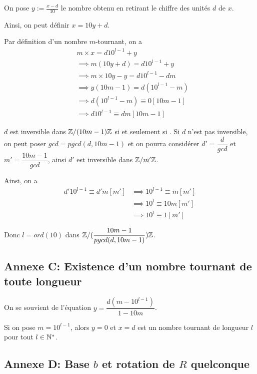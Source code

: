 \documentclass[a4paper,12pt]{article}
\begin{document}
\begin{demonstration}
    On pose $y := \frac{x - d}{10}$ le nombre obtenu en retirant le chiffre des unités $d$ de $x$.

    Ainsi, on peut définir $x = 10y + d$.

    Par définition d'un nombre $m$-tournant, on a
    \begin{align*}
        &m \times x = d10^{l - 1} + y \\
        &\implies m(10y + d) = d10^{l - 1} + y \\
        &\implies m \times 10y - y = d10^{l - 1} - dm \\
        &\implies y(10m - 1) = d(10^{l - 1} - m) \\
        &\implies d(10^{l - 1} - m) \equiv 0 [10m - 1] \\
        &\implies d 10^{l - 1} \equiv dm [10m - 1]
    \end{align*}

    $d$ est inversible dans $\mathbb{Z}/(10m - 1)\mathbb{Z}$ si et seulement si .
    Si $d$ n'est pas inversible, on peut poser $gcd = pgcd(d, 10m - 1)$ et on pourra considérer $d' = \dfrac{d}{gcd}$ et $m' = \dfrac{10m - 1}{gcd}$, ainsi $d'$ est inversible dans $\mathbb{Z}/m'\mathbb{Z}$.

    Ainsi, on a
    \begin{align*}
        d' 10^{l - 1} \equiv d'm [m'] &\implies 10^{l - 1} \equiv m [m'] \\
        &\implies 10^l \equiv 10m [m'] \\
        &\implies 10^l \equiv 1 [m']
    \end{align*}

    Donc $l = ord(10)$ dans $\mathbb{Z}/(\dfrac{10m - 1}{pgcd(d, 10m - 1)})\mathbb{Z}$.
\end{demonstration}

\subsection*{Annexe C: Existence d'un nombre tournant de toute longueur}

On se souvient de l'équation $y = \dfrac{d(m - 10^{l - 1})}{1 - 10m}$.

Si on pose $m = 10^{l - 1}$, alors $y = 0$ et $x = d$ est un nombre tournant de longueur $l$ pour tout $l \in \mathbb{N}^*$.

\subsection*{Annexe D: Base $b$ et rotation de $R$ quelconque}
\end{document}
